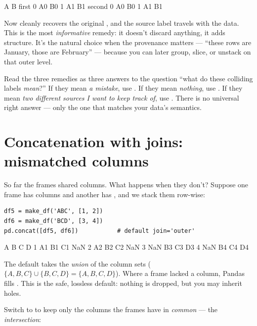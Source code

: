 \documentclass[11pt]{article}
\begin{document}
\begin{outblock}
           A   B
first  0  A0  B0
       1  A1  B1
second 0  A0  B0
       1  A1  B1
\end{outblock}

Now  cleanly recovers the original , and the source label travels with the data. This is the most \emph{informative} remedy: it doesn't discard anything, it adds structure. It's the natural choice when the provenance matters --- ``these rows are January, those are February'' --- because you can later group, slice, or unstack on that outer level.

\begin{intuition}
Read the three remedies as three answers to the question ``what do these colliding labels \emph{mean}?'' If they mean \emph{a mistake}, use . If they mean \emph{nothing}, use . If they mean \emph{two different sources I want to keep track of}, use . There is no universal right answer --- only the one that matches your data's semantics.
\end{intuition}

\section{Concatenation with joins: mismatched columns}

So far the frames shared columns. What happens when they don't? Suppose one frame has columns  and another has , and we stack them row-wise:

\begin{lstlisting}
df5 = make_df('ABC', [1, 2])
df6 = make_df('BCD', [3, 4])
pd.concat([df5, df6])           # default join='outer'
\end{lstlisting}

\begin{outblock}
     A   B   C    D
1   A1  B1  C1  NaN
2   A2  B2  C2  NaN
3  NaN  B3  C3   D3
4  NaN  B4  C4   D4
\end{outblock}

The default  takes the \emph{union} of the column sets ($\{A,B,C\}\cup\{B,C,D\}=\{A,B,C,D\}$). Where a frame lacked a column, Pandas fills . This is the safe, lossless default: nothing is dropped, but you may inherit holes.

Switch to  to keep only the columns the frames have in \emph{common} --- the \emph{intersection}:
\end{document}
